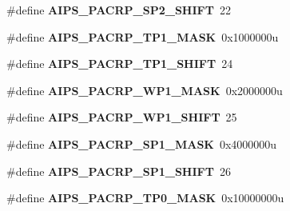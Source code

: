 \begin{DoxyCompactItemize}
\item 
\#define {\bfseries A\+I\+P\+S\+\_\+\+P\+A\+C\+R\+P\+\_\+\+S\+P2\+\_\+\+S\+H\+I\+FT}~22\hypertarget{group__AIPS__Register__Masks_ga34cbbd43766ea51cdbe60858d5e612d5}{}\label{group__AIPS__Register__Masks_ga34cbbd43766ea51cdbe60858d5e612d5}

\item 
\#define {\bfseries A\+I\+P\+S\+\_\+\+P\+A\+C\+R\+P\+\_\+\+T\+P1\+\_\+\+M\+A\+SK}~0x1000000u\hypertarget{group__AIPS__Register__Masks_ga2fe235c806d77fa5d23c0fcac9049290}{}\label{group__AIPS__Register__Masks_ga2fe235c806d77fa5d23c0fcac9049290}

\item 
\#define {\bfseries A\+I\+P\+S\+\_\+\+P\+A\+C\+R\+P\+\_\+\+T\+P1\+\_\+\+S\+H\+I\+FT}~24\hypertarget{group__AIPS__Register__Masks_gaa40b9ae55dc39d99d8dba579a1093059}{}\label{group__AIPS__Register__Masks_gaa40b9ae55dc39d99d8dba579a1093059}

\item 
\#define {\bfseries A\+I\+P\+S\+\_\+\+P\+A\+C\+R\+P\+\_\+\+W\+P1\+\_\+\+M\+A\+SK}~0x2000000u\hypertarget{group__AIPS__Register__Masks_ga28739fcab59849c84a714dc0b1ec4a01}{}\label{group__AIPS__Register__Masks_ga28739fcab59849c84a714dc0b1ec4a01}

\item 
\#define {\bfseries A\+I\+P\+S\+\_\+\+P\+A\+C\+R\+P\+\_\+\+W\+P1\+\_\+\+S\+H\+I\+FT}~25\hypertarget{group__AIPS__Register__Masks_ga26d8115081f73e0b31140ab74bcc3d83}{}\label{group__AIPS__Register__Masks_ga26d8115081f73e0b31140ab74bcc3d83}

\item 
\#define {\bfseries A\+I\+P\+S\+\_\+\+P\+A\+C\+R\+P\+\_\+\+S\+P1\+\_\+\+M\+A\+SK}~0x4000000u\hypertarget{group__AIPS__Register__Masks_ga73ee2c6cd93e9f7c8a6216bdd6ca4330}{}\label{group__AIPS__Register__Masks_ga73ee2c6cd93e9f7c8a6216bdd6ca4330}

\item 
\#define {\bfseries A\+I\+P\+S\+\_\+\+P\+A\+C\+R\+P\+\_\+\+S\+P1\+\_\+\+S\+H\+I\+FT}~26\hypertarget{group__AIPS__Register__Masks_ga19261bb611a66112d7d17cf1e942fa5f}{}\label{group__AIPS__Register__Masks_ga19261bb611a66112d7d17cf1e942fa5f}

\item 
\#define {\bfseries A\+I\+P\+S\+\_\+\+P\+A\+C\+R\+P\+\_\+\+T\+P0\+\_\+\+M\+A\+SK}~0x10000000u\hypertarget{group__AIPS__Register__Masks_ga58167e13d9a50947df0c63e79f87c9e0}{}\label{group__AIPS__Register__Masks_ga58167e13d9a50947df0c63e79f87c9e0}


\end{DoxyCompactItemize}
